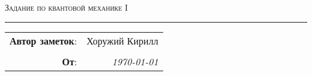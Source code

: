 
\begin{center}
    \LARGE \textsc{Задание по квантовой механике I}
\end{center}

\hrule

\phantom{42}

\begin{flushright}
    \begin{tabular}{rr}
        \textbf{Автор заметок}: 
        & Хоружий Кирилл \\
        & \\
        \textbf{От}: &
        \textit{\today}\\
    \end{tabular}
\end{flushright}

\thispagestyle{empty}
\tableofcontents
